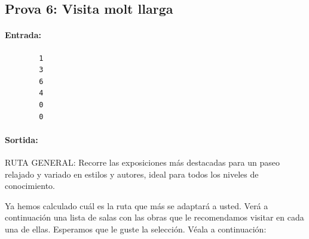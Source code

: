 \documentclass[a4paper]{article}
\begin{document}
	\subsection{Prova 6: Visita molt llarga}
	\paragraph{Entrada:}
	\begin{verbatim}
		1
		3
		6
		4
		0
		0
	\end{verbatim}

	\paragraph{Sortida:\\}
		RUTA GENERAL: Recorre las exposiciones más destacadas para un paseo relajado y variado en estilos y autores, ideal para todos los niveles de conocimiento.
		
		Ya hemos calculado cuál es la ruta que más se adaptará a usted. Verá a continuación una lista de salas con las obras que le recomendamos visitar en cada una de ellas. Esperamos que le guste la selección. Véala a continuación:
		
\end{document}
